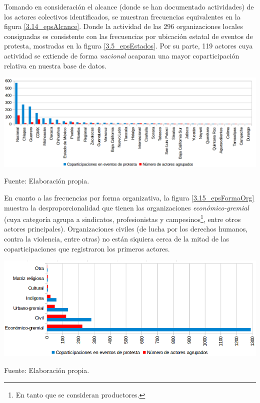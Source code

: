 \documentclass[letterpaper, 11pt]{book}
\theoremstyle{definition}
\theoremstyle{remark}
\begin{document}
Tomando en consideración el alcance (donde se han documentado actividades) de los actores colectivos identificados, se muestran frecuencias equivalentes en la figura \ref{3.14_epsAlcance}. 
Donde la actividad de las 296 organizaciones locales consignadas es consistente con las frecuencias por ubicación estatal de eventos de protesta, mostradas en la figura \ref{3.5_epsEstados}. 
Por su parte, 119 actores cuya actividad se extiende de forma \emph{nacional} acaparan una mayor coparticipación relativa en nuestra base de datos. 


\begin{minipage}{\linewidth}
\centering
{} \label{3.14_epsAlcance}
\hspace{-2em}\includegraphics[scale=0.42]{img/3.14_epsAlcance.png}
\par\bigskip
\small Fuente: Elaboración propia.
\end{minipage}\bigskip


En cuanto a las frecuencias por forma organizativa, la figura \ref{3.15_epsFormaOrg} muestra la desproporcionalidad que tienen las organizaciones \emph{económico-gremial} (cuya categoría agrupa a sindicatos, profesionistas y campesinos\footnote{
    En tanto que se consideran productores.
}, 
entre otros actores principales). 
Organizaciones civiles (de lucha por los derechos humanos, contra la violencia, entre otras) no están siquiera cerca de la mitad de las coparticipaciones que registraron los primeros actores.

\begin{minipage}{\linewidth}
\centering
{} \label{3.15_epsFormaOrg}
\includegraphics[scale=0.42]{img/3.15_epsFormaOrg.png}
\par\bigskip
\small Fuente: Elaboración propia.
\end{minipage}\bigskip
\end{document}
